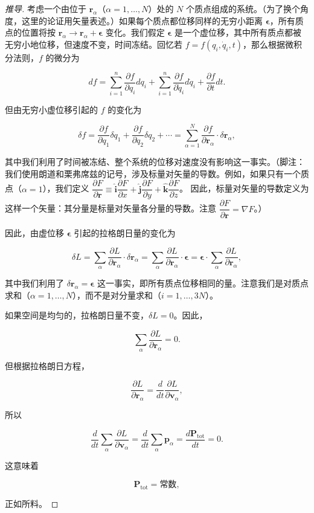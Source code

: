 \begin{proof}[推导]
考虑一个由位于 $\mathbf{r}_\alpha$（$\alpha = 1, \ldots, N$）处的 $N$ 个质点组成的系统。（为了换个角度，这里的论证用矢量表述。）如果每个质点都位移同样的无穷小距离 $\boldsymbol{\epsilon}$，所有质点的位置将按 $\mathbf{r}_\alpha \to \mathbf{r}_\alpha + \boldsymbol{\epsilon}$ 变化。我们假定 $\boldsymbol{\epsilon}$ 是一个虚位移，其中所有质点都被无穷小地位移，但速度不变，时间冻结。回忆若 $f = f(q_i, \dot{q}_i, t)$，那么根据微积分法则，$f$ 的微分为

\[
df = \sum_{i=1}^{n}\frac{\partial f}{\partial q_i}dq_i + \sum_{i=1}^{n}\frac{\partial f}{\partial \dot{q}_i}d\dot{q}_i + \frac{\partial f}{\partial t}dt.
\]

但由无穷小虚位移引起的 $f$ 的变化为

\[
\delta f = \frac{\partial f}{\partial q_1}\delta q_1 + \frac{\partial f}{\partial q_2}\delta q_2 + \cdots = \sum_{\alpha=1}^{N}\frac{\partial f}{\partial \mathbf{r}_\alpha}\cdot\delta\mathbf{r}_\alpha,
\]

其中我们利用了时间被冻结、整个系统的位移对速度没有影响这一事实。（脚注：我们使用朗道和栗弗席兹的记号，涉及标量对矢量的导数。例如，如果只有一个质点（$\alpha = 1$），我们定义 $\dfrac{\partial F}{\partial \mathbf{r}} \equiv \hat{\mathbf{i}}\dfrac{\partial F}{\partial x} + \hat{\mathbf{j}}\dfrac{\partial F}{\partial y} + \hat{\mathbf{k}}\dfrac{\partial F}{\partial z}$。 因此，标量对矢量的导数定义为这样一个矢量：其分量是标量对矢量各分量的导数。注意 $\dfrac{\partial F}{\partial \mathbf{r}} = \nabla F$。）

因此，由虚位移 $\boldsymbol{\epsilon}$ 引起的拉格朗日量的变化为

\[
\delta L = \sum_{\alpha}\frac{\partial L}{\partial \mathbf{r}_\alpha}\cdot\delta\mathbf{r}_\alpha = \sum_{\alpha}\frac{\partial L}{\partial \mathbf{r}_\alpha}\cdot\boldsymbol{\epsilon} = \boldsymbol{\epsilon}\cdot\sum_{\alpha}\frac{\partial L}{\partial \mathbf{r}_\alpha},
\]

其中我们利用了 $\delta\mathbf{r}_\alpha = \boldsymbol{\epsilon}$ 这一事实，即所有质点位移相同的量。注意我们是对质点求和（$\alpha = 1, \ldots, N$），而不是对分量求和（$i = 1, \ldots, 3N$）。

如果空间是均匀的，拉格朗日量不变，$\delta L = 0$。因此，

\[
\sum_{\alpha}\frac{\partial L}{\partial \mathbf{r}_\alpha} = 0.
\]

但根据拉格朗日方程，

\[
\frac{\partial L}{\partial \mathbf{r}_\alpha} = \frac{d}{dt}\frac{\partial L}{\partial \mathbf{v}_\alpha},
\]

所以

\[
\frac{d}{dt}\sum_{\alpha}\frac{\partial L}{\partial \mathbf{v}_\alpha} = \frac{d}{dt}\sum_{\alpha}\mathbf{p}_\alpha = \frac{d\mathbf{P}_{\mathrm{tot}}}{dt} = 0.
\]

这意味着

\[
\mathbf{P}_{\mathrm{tot}} = \text{常数},
\]

正如所料。
\end{proof}

